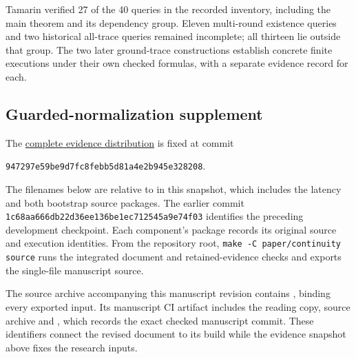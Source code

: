 \documentclass[pdflatex]{sn-jnl}
\theoremstyle{thmstyleone}
\theoremstyle{thmstylethree}
\theoremstyle{thmstyletwo}
\begin{document}
Tamarin verified 27 of the 40 queries in the recorded inventory,
including the main theorem and its dependency group. Eleven multi-round
existence queries and two historical all-trace queries remained
incomplete; all thirteen lie outside that group. The two later
ground-trace constructions establish concrete finite executions under
their own checked formulas, with a separate evidence record for each.


\subsection{Guarded-normalization supplement}

The \href{https://github.com/billlza/q-periapt/tree/947297e59be9d7fc8febb5d81a4e2b945e328208/paper/continuity}{complete evidence distribution}
is fixed at commit
\begin{center}
\small\texttt{947297e59be9d7fc8febb5d81a4e2b945e328208}.
\end{center}
The filenames below are relative to  in this
snapshot, which includes the latency and both bootstrap source packages.
The earlier commit \texttt{1c68aa666db22d36ee136be1ec712545a9e74f03}
identifies the preceding development checkpoint. Each component's package
records its original source and execution identities.
From the repository root, \texttt{make -C paper/continuity source} runs
the integrated document and retained-evidence checks and exports the
single-file manuscript source.

The source archive accompanying this manuscript revision contains
, binding every exported input. Its manuscript CI
artifact includes the reading copy, source archive and
, which records the exact checked manuscript
commit. These identifiers connect the revised document to its build
while the evidence snapshot above fixes the research inputs.
\end{document}
